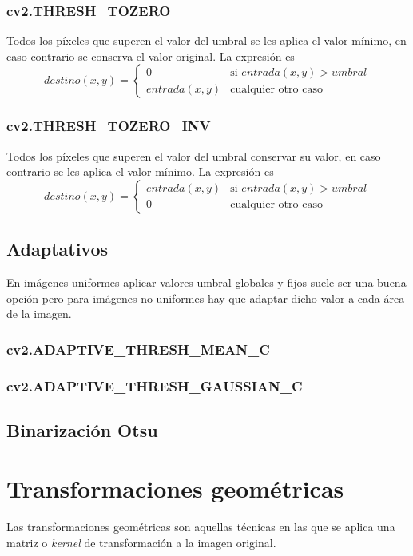 \subsubsection{cv2.THRESH\_TOZERO}
Todos los píxeles que superen el valor del umbral se les aplica el
valor mínimo, en caso contrario se conserva el valor original. La
expresión es
\begin{equation*}
  destino(x, y) =
  \begin{cases}
    0 & \text{si } entrada(x, y) > umbral \\
    entrada(x, y) & \text{cualquier otro caso}
  \end{cases}
\end{equation*}
\subsubsection{cv2.THRESH\_TOZERO\_INV}
Todos los píxeles que superen el valor del umbral conservar su valor,
en caso contrario se les aplica el valor mínimo. La expresión es
\begin{equation*}
  destino(x, y) =
  \begin{cases}
    entrada(x, y) & \text{si } entrada(x, y) > umbral \\
    0 & \text{cualquier otro caso}
  \end{cases}
\end{equation*}
\subsection{Adaptativos}
En imágenes uniformes aplicar valores umbral globales y fijos suele
ser una buena opción pero para imágenes no uniformes hay que adaptar
dicho valor a cada área de la imagen.
\subsubsection{cv2.ADAPTIVE_THRESH_MEAN_C }
\subsubsection{cv2.ADAPTIVE_THRESH_GAUSSIAN_C}

\subsection{Binarización Otsu}

\section{Transformaciones geométricas}
Las transformaciones geométricas son aquellas técnicas en las que se
aplica una matriz o \emph{kernel} de transformación a la imagen
original.
